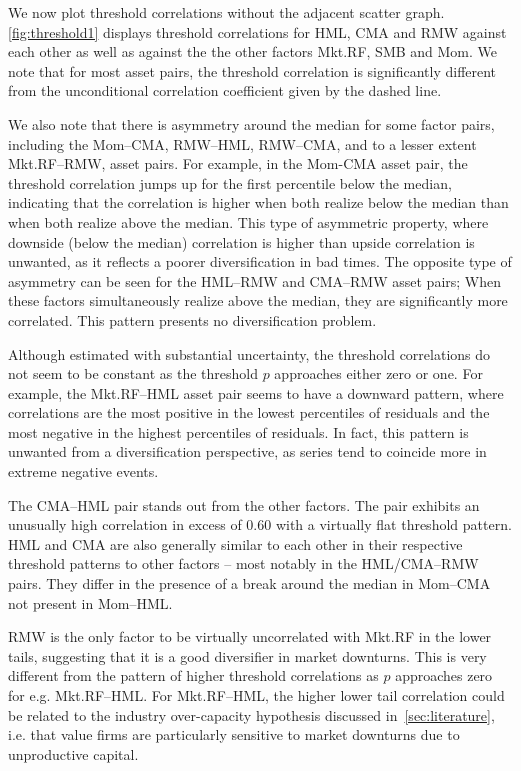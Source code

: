 We now plot threshold correlations without the adjacent scatter graph. \autoref{fig:threshold1} displays threshold correlations for HML, CMA and RMW against each other as well as against the the other factors Mkt.RF, SMB and Mom. We note that for most asset pairs, the threshold correlation is significantly different from the unconditional correlation coefficient given by the dashed line.

We also note that there is asymmetry around the median for some factor pairs, including the Mom--CMA, RMW--HML, RMW--CMA, and to a lesser extent Mkt.RF--RMW, asset pairs. For example, in the Mom-CMA asset pair, the threshold correlation jumps up for the first percentile below the median, indicating that the correlation is higher when both realize below the median than when both realize above the median. This type of asymmetric property, where downside (below the median) correlation is higher than upside correlation is unwanted, as it reflects a poorer diversification in bad times. The opposite type of asymmetry can be seen for the HML--RMW and CMA--RMW asset pairs; When these factors simultaneously realize above the median, they are significantly more correlated. This pattern presents no diversification problem.

Although estimated with substantial uncertainty, the threshold correlations do not seem to be constant as the threshold $p$ approaches either zero or one. For example, the Mkt.RF--HML asset pair seems to have a downward pattern, where correlations are the most positive in the lowest percentiles of residuals and the most negative in the highest percentiles of residuals. In fact, this pattern is unwanted from a diversification perspective, as series tend to coincide more in extreme negative events. 

The CMA--HML pair stands out from the other factors. The pair exhibits an unusually high correlation in excess of $0.60$ with a virtually flat threshold pattern. HML and CMA are also generally similar to each other in their respective threshold patterns to other factors -- most notably in the HML/CMA--RMW pairs. They differ in the presence of a break around the median in Mom--CMA not present in Mom--HML.

RMW is the only factor to be virtually uncorrelated with Mkt.RF in the lower tails, suggesting that it is a good diversifier in market downturns. This is very different from the pattern of higher threshold correlations as $p$ approaches zero for e.g. Mkt.RF--HML. For Mkt.RF--HML, the higher lower tail correlation could be related to the industry over-capacity hypothesis discussed in~\autoref{sec:literature}, i.e. that value firms are particularly sensitive to market downturns due to unproductive capital.

